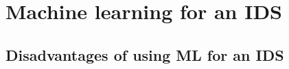 
\chapter{Machine learning for an IDS} %

\label{Chapter3} %

\section{Disadvantages of using ML for an IDS}
